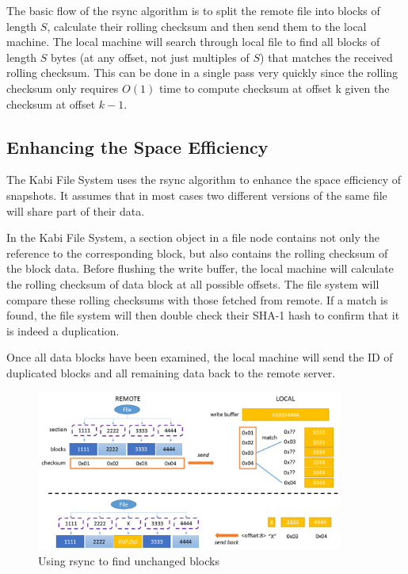     The basic flow of the rsync algorithm is to split the remote file into blocks of length $S$, calculate their rolling checksum and then send them to the local machine. The local machine will search through local file to find all blocks of length $S$ bytes (at any offset, not just multiples of $S$) that matches the received rolling checksum. This can be done in a single pass very quickly since the rolling checksum only requires $O(1)$ time to compute checksum at offset k given the checksum at offset $k-1$.

\subsection{Enhancing the Space Efficiency}

    The Kabi File System uses the rsync algorithm to enhance the space efficiency of snapshots. It assumes that in most cases two different versions of the same file will share part of their data.

    In the Kabi File System, a section object in a file node contains not only the reference to the corresponding block, but also contains the rolling checksum of the block data. Before flushing the write buffer, the local machine will calculate the rolling checksum of data block at all possible offsets. The file system will compare these rolling checksums with those fetched from remote. If a match is found, the file system will then double check their SHA-1 hash to confirm that it is indeed a duplication.
    
    Once all data blocks have been examined, the local machine will send the ID of duplicated blocks and all remaining data back to the remote server.


\begin{figure}[t]
\centering
\includegraphics[width=0.9\textwidth]{Chapter-4/figs/fig25.png}
\caption{Using rsync to find unchanged blocks}
\label{fig:rsync}
\end{figure}

